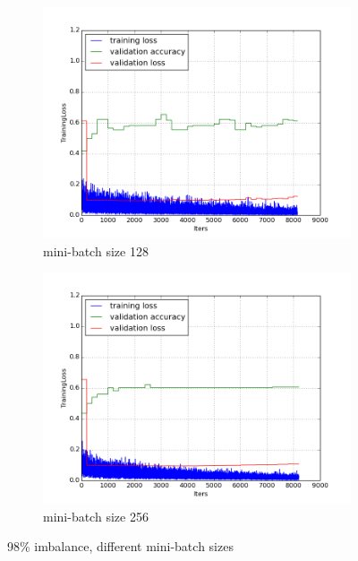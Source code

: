 \documentclass[a4paper,11pt]{article}
\begin{document}
\begin{figure}
    \centering
    \begin{minipage}[b]{\textwidth}
      \begin{subfigure}{.5\textwidth} 
        \centering
        \includegraphics[scale=0.4]{images/plot_clampdetCI98_none_bs128_lr4.png}
        \caption{mini-batch size 128}\label{fig:2a}
      \end{subfigure}%
      \begin{subfigure}{.5\textwidth} 
        \centering
        \includegraphics[scale=0.4]{images/plot_clampdetCI98_none_bs256_lr4.png}
        \caption{mini-batch size 256}\label{fig:2b}
      \end{subfigure} \par \vspace*{20pt} %
      \caption{98\% imbalance, different mini-batch sizes}\label{fig:2}
    \end{minipage}%
\end{figure}
\end{document}
